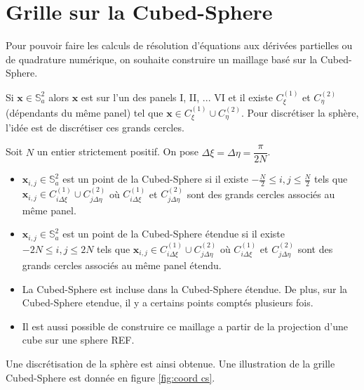 \section{Grille sur la Cubed-Sphere}

Pour pouvoir faire les calculs de résolution d'équations aux dérivées partielles ou de quadrature numérique, on souhaite construire un maillage basé sur la Cubed-Sphere.

Si $\mathbf{x} \in \mathbb{S}_a^2$ alors $\mathbf{x}$ est sur l'un des panels I, II, ... VI et il existe $C_{\xi}^(1)$ et $C_{\eta}^(2)$ (dépendants du même panel) tel que $\mathbf{x} \in C_{\xi}^(1) \cup C_{\eta}^(2)$. Pour discrétiser la sphère, l'idée est de discrétiser ces grands cercles.

\begin{definition}
Soit $N$ un entier strictement positif. On pose $\Delta \xi = \Delta \eta = \dfrac{\pi}{2N}$.
\begin{itemize}
\item $\mathbf{x}_{i,j} \in \mathbb{S}_a^2$ est un point de la Cubed-Sphere si il existe $-\frac{N}{2} \leq i,j \leq \frac{N}{2}$ tels que $\mathbf{x}_{i,j} \in C_{i \Delta \xi}^(1) \cup C_{j \Delta \eta}^(2)$ où $C_{i \Delta \xi}^(1)$ et $C_{j \Delta \eta}^(2)$ sont des grands cercles associés au même panel.

\item $\mathbf{x}_{i,j} \in \mathbb{S}_a^2$ est un point de la Cubed-Sphere étendue si il existe $-2N \leq i,j \leq 2N$ tels que $\mathbf{x}_{i,j} \in C_{i \Delta \xi}^(1) \cup C_{j \Delta \eta}^(2)$ où $C_{i \Delta \xi}^(1)$ et $C_{j \Delta \eta}^(2)$ sont des grands cercles associés au même panel étendu.
\end{itemize}
\end{definition}

\begin{remarque}
\begin{itemize}
\item La Cubed-Sphere est incluse dans la Cubed-Sphere étendue. De plus, sur la Cubed-Sphere etendue, il y a certains points comptés plusieurs fois.
\item Il est aussi possible de construire ce maillage a partir de la projection d'une cube sur une sphere REF.
\end{itemize}
\end{remarque}

Une discrétisation de la sphère est ainsi obtenue. Une illustration de la grille Cubed-Sphere est donnée en figure \ref{fig:coord cs}.

